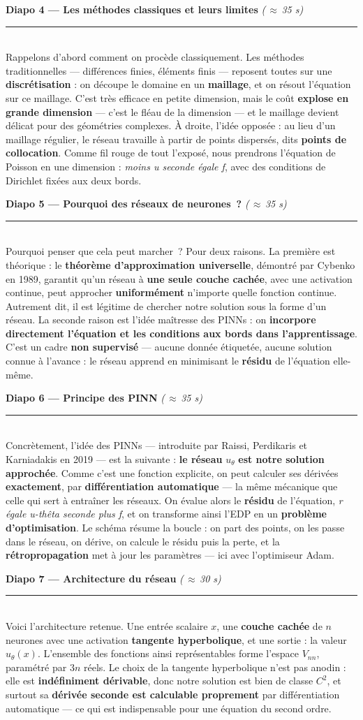 \documentclass[11pt]{article}
\newcommand{\diapo}[3]{%
  \vspace{10pt}%
  {\sffamily\bfseries\color{bblue}\large Diapo #1 — #2}%
  \hfill{\sffamily\small\color{dblue}\itshape (#3)}\\[-2pt]
  {\color{bblue}\rule{\linewidth}{0.8pt}}\\[4pt]}
\newcommand{\key}[1]{\textbf{#1}}
\begin{document}
\diapo{4}{Les méthodes classiques et leurs limites}{\,$\approx$\,35 s}
Rappelons d'abord comment on procède classiquement. Les méthodes traditionnelles
— différences finies, éléments finis — reposent toutes sur une
\key{discrétisation} : on découpe le domaine en un \key{maillage}, et on résout
l'équation sur ce maillage. C'est très efficace en petite dimension, mais le coût
\key{explose en grande dimension} — c'est le fléau de la dimension — et le
maillage devient délicat pour des géométries complexes. À droite, l'idée
opposée : au lieu d'un maillage régulier, le réseau travaille à partir de points
dispersés, dits \key{points de collocation}. Comme fil rouge de tout l'exposé,
nous prendrons l'équation de Poisson en une dimension : \emph{moins u seconde
égale f}, avec des conditions de Dirichlet fixées aux deux bords.

\diapo{5}{Pourquoi des réseaux de neurones~?}{\,$\approx$\,35 s}
Pourquoi penser que cela peut marcher~? Pour deux raisons. La première est
théorique : le \key{théorème d'approximation universelle}, démontré par Cybenko
en 1989, garantit qu'un réseau à \key{une seule couche cachée}, avec une
activation continue, peut approcher \key{uniformément} n'importe quelle fonction
continue. Autrement dit, il est légitime de chercher notre solution sous la forme
d'un réseau. La seconde raison est l'idée maîtresse des PINNs : on \key{incorpore
directement l'équation et les conditions aux bords dans l'apprentissage}. C'est un
cadre \key{non supervisé} — aucune donnée étiquetée, aucune solution connue à
l'avance : le réseau apprend en minimisant le \key{résidu} de l'équation
elle-même.

\diapo{6}{Principe des PINN}{\,$\approx$\,35 s}
Concrètement, l'idée des PINNs — introduite par Raissi, Perdikaris et Karniadakis
en 2019 — est la suivante : \key{le réseau} $u_\theta$ \key{est notre solution
approchée}. Comme c'est une fonction explicite, on peut calculer ses dérivées
\key{exactement}, par \key{différentiation automatique} — la même mécanique que
celle qui sert à entraîner les réseaux. On évalue alors le \key{résidu} de
l'équation, \emph{r égale u-thêta seconde plus f}, et on transforme ainsi l'EDP en
un \key{problème d'optimisation}. Le schéma résume la boucle : on part des points,
on les passe dans le réseau, on dérive, on calcule le résidu puis la perte, et la
\key{rétropropagation} met à jour les paramètres — ici avec l'optimiseur Adam.

\diapo{7}{Architecture du réseau}{\,$\approx$\,30 s}
Voici l'architecture retenue. Une entrée scalaire $x$, une \key{couche cachée}
de $n$ neurones avec une activation \key{tangente hyperbolique}, et une sortie :
la valeur $u_\theta(x)$. L'ensemble des fonctions ainsi représentables forme
l'espace $V_{nn}$, paramétré par $3n$ réels. Le choix de la tangente hyperbolique
n'est pas anodin : elle est \key{indéfiniment dérivable}, donc notre solution est
bien de classe $C^2$, et surtout sa \key{dérivée seconde est calculable
proprement} par différentiation automatique — ce qui est indispensable pour une
équation du second ordre.
\end{document}
